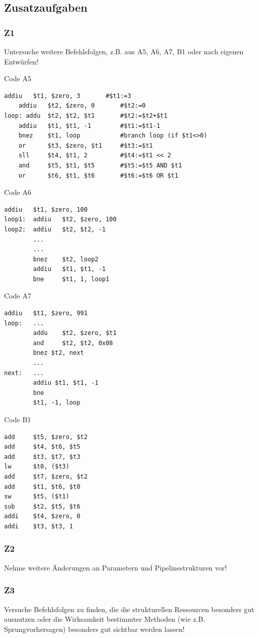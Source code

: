 \documentclass[a4paper,12pt,titlepage]{scrartcl}
\begin{document}
\newpage
\subsection*{Zusatzaufgaben}
\subsubsection*{Z1}
Untersuche weitere Befehlsfolgen, z.B. aus A5, A6, A7, B1 oder nach eigenen Entwürfen!

Code A5
\begin{lstlisting}[basicstyle=\tiny]
    addiu   $t1, $zero, 3       #$t1:=3
    addiu   $t2, $zero, 0       #$t2:=0
loop: addu  $t2, $t2, $t1       #$t2:=$t2+$t1
    addiu   $t1, $t1, -1        #$t1:=$t1-1
    bnez    $t1, loop           #branch loop (if $t1<>0)
    or      $t3, $zero, $t1     #$t3:=$t1
    sll     $t4, $t1, 2         #$t4:=$t1 << 2
    and     $t5, $t1, $t5       #$t5:=$t5 AND $t1
    or      $t6, $t1, $t6       #$t6:=$t6 OR $t1
\end{lstlisting}

Code A6
\begin{lstlisting}[basicstyle=\tiny]
        addiu   $t1, $zero, 100
loop1:  addiu   $t2, $zero, 100
loop2:  addiu   $t2, $t2, -1
        ...
        ...
        bnez    $t2, loop2
        addiu   $t1, $t1, -1
        bne     $t1, 1, loop1
\end{lstlisting}

Code A7
\begin{lstlisting}[basicstyle=\tiny]
        addiu   $t1, $zero, 991
loop:   ...
        addu    $t2, $zero, $t1
        and     $t2, $t2, 0x08
        bnez $t2, next
        ...
next:   ...
        addiu $t1, $t1, -1
        bne
        $t1, -1, loop
\end{lstlisting}

Code B1
\begin{lstlisting}[basicstyle=\tiny]
add     $t5, $zero, $t2
add     $t4, $t6, $t5
add     $t3, $t7, $t3
lw      $t0, ($t3)
add     $t7, $zero, $t2
add     $t1, $t6, $t0
sw      $t5, ($t1)
sub     $t2, $t5, $t6
addi    $t4, $zero, 0
addi    $t3, $t3, 1
\end{lstlisting}

\subsubsection*{Z2}
Nehme weitere Änderungen an Parametern und Pipelinestrukturen vor!

\subsubsection*{Z3}
Versuche Befehlsfolgen zu finden, die die strukturellen Ressourcen besonders gut ausnutzen oder die Wirksamkeit bestimmter Methoden (wie z.B. Sprungvorhersagen) besonders gut sichtbar werden lassen!
\end{document}
